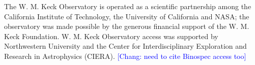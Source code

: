 \documentclass[twocolumn]{aastex631}
\newcommand{\chang}[1]{\textcolor{blue}{[Chang: #1]}}
\begin{document}
\begin{CJK*}{UTF8}{gbsn}
The W. M. Keck Observatory is operated as a scientific partnership among the California Institute of Technology, the University of California and NASA; the observatory was made possible by the generous financial support of the W. M. Keck Foundation. W. M. Keck Observatory access was supported by Northwestern University and the Center for Interdisciplinary Exploration and Research in Astrophysics (CIERA). \chang{need to cite Binospec access too}









\end{CJK*}
\end{document}
